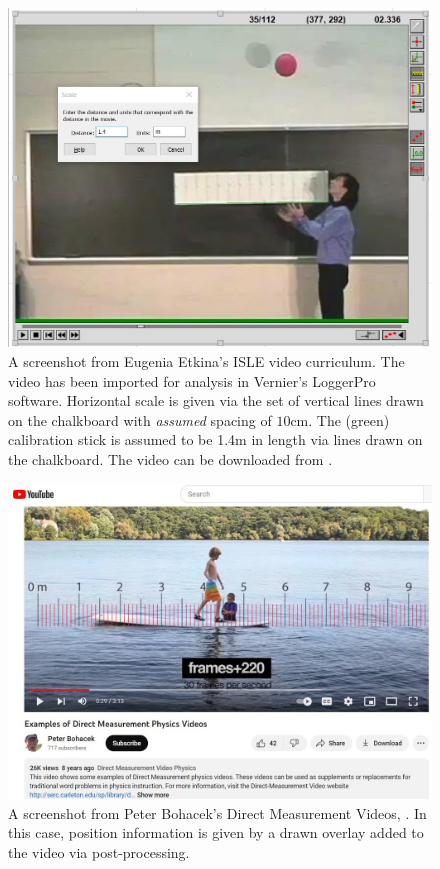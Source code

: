 \documentclass[prb,twocolumn]{revtex4-2}
\begin{document}
\begin{figure}[h]
\centering
\includegraphics[width=\columnwidth]{Etkina-calibration.jpg}
\caption{ 
A screenshot from Eugenia Etkina's ISLE video curriculum.  The video has been imported for analysis in Vernier's LoggerPro software.    Horizontal  scale is given via the set of vertical lines drawn on the chalkboard with \textit{assumed} spacing of $10$cm. The (green) calibration stick is assumed to be 1.4m in length via lines drawn on the chalkboard.  The video can be downloaded from \cite{ISLE_ball_video_source} .
}
\label{Etkina-calibration}
\end{figure}

\begin{figure}[h]
\centering
\includegraphics[width=\columnwidth]{Bohacek-1.jpg}
\caption{A screenshot from Peter Bohacek's Direct Measurement Videos, \cite{Bohacek_youtube_intro}. In this case, position information is given by a drawn overlay added to the video via post-processing.
}
\label{Bohacek-1}
\end{figure}
\end{document}
